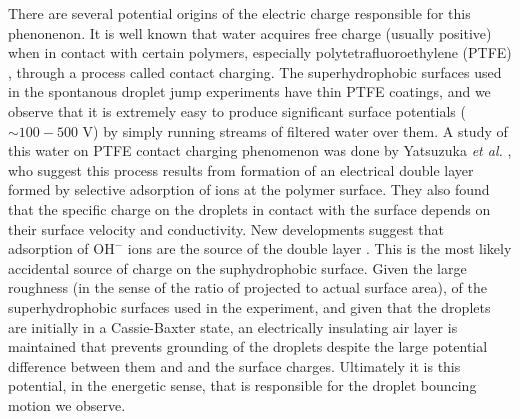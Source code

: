 \documentclass[10pt,a4paper]{article}
\begin{document}
There are several potential origins of the electric charge responsible for this phenonenon. It is well known that water acquires free charge (usually positive) when in contact with certain polymers, especially polytetrafluoroethylene (PTFE) \cite{langmuir_surface_1938}, through a process called contact charging. The superhydrophobic surfaces used in the spontanous droplet jump experiments have thin PTFE coatings, and we observe that it is extremely easy to produce significant surface potentials ($\sim 100-500$ V) by simply running streams of filtered water over them. A study of this water on PTFE contact charging phenomenon was done by Yatsuzuka \emph{et al.} \cite{yatsuzuka_electrification_1994}, who suggest this process results from formation of an electrical double layer formed by selective adsorption of ions at the polymer surface. They also found that the specific charge on the droplets in contact with the surface depends on their surface velocity and conductivity. New developments suggest that adsorption of $\mbox{OH}^-$ ions are the source of the double layer \cite{beattie_intrinsic_2006} \cite{strazdaite_water_2015}. This is the most likely accidental source of charge on the suphydrophobic surface. Given the large roughness (in the sense of the ratio of projected to actual surface area), of the superhydrophobic surfaces used in the experiment, and given that the droplets are initially in a Cassie-Baxter state, an electrically insulating air layer is maintained that prevents grounding of the droplets despite the large potential difference between them and and the surface charges. Ultimately it is this potential, in the energetic sense, that is responsible for the droplet bouncing motion we observe. 
\end{document}
